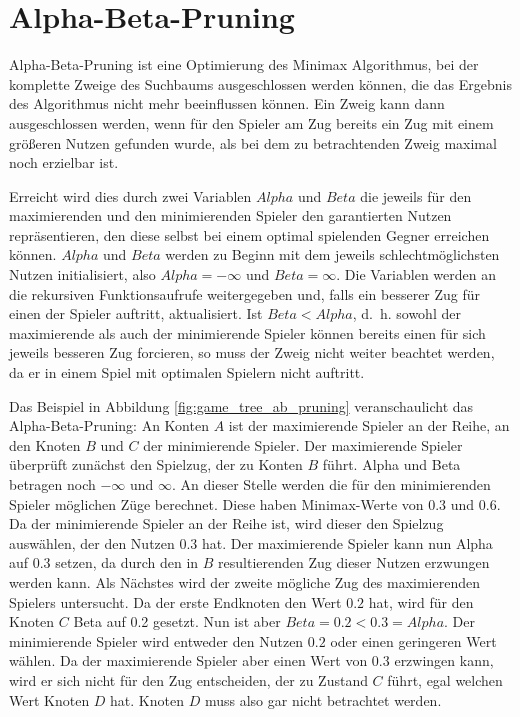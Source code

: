 \section{Alpha-Beta-Pruning}

Alpha-Beta-Pruning ist eine Optimierung des Minimax Algorithmus, bei der komplette Zweige des Suchbaums ausgeschlossen
werden können, die das Ergebnis des Algorithmus nicht mehr beeinflussen können. Ein Zweig kann dann ausgeschlossen
werden, wenn für den Spieler am Zug bereits ein Zug mit einem größeren Nutzen gefunden wurde, als bei dem zu
betrachtenden Zweig maximal noch erzielbar ist.

Erreicht wird dies durch zwei Variablen $Alpha$ und $Beta$ die jeweils für den maximierenden und den minimierenden
Spieler den garantierten Nutzen repräsentieren, den diese selbst bei einem optimal spielenden Gegner erreichen können.
$Alpha$ und $Beta$ werden zu Beginn mit dem jeweils schlechtmöglichsten Nutzen initialisiert, also $Alpha = -\infty$ und
$Beta = \infty$. Die Variablen werden an die rekursiven Funktionsaufrufe weitergegeben und, falls ein besserer Zug für
einen der Spieler auftritt, aktualisiert. Ist $Beta < Alpha$, d. h. sowohl der maximierende als auch der minimierende
Spieler können bereits einen für sich jeweils besseren Zug forcieren, so muss der Zweig nicht weiter beachtet werden, da
er in einem Spiel mit optimalen Spielern nicht auftritt.

Das Beispiel in Abbildung \ref{fig:game_tree_ab_pruning} veranschaulicht das Alpha-Beta-Pruning: An Konten $A$ ist der
maximierende Spieler an der Reihe, an den Knoten $B$ und $C$ der minimierende Spieler. Der maximierende Spieler
überprüft zunächst den Spielzug, der zu Konten $B$ führt. Alpha und Beta betragen noch $-\infty$ und $\infty$. An dieser
Stelle werden die für den minimierenden Spieler möglichen Züge berechnet. Diese haben Minimax-Werte von $0.3$ und $0.6$.
Da der minimierende Spieler an der Reihe ist, wird dieser den Spielzug auswählen, der den Nutzen $0.3$ hat. Der
maximierende Spieler kann nun Alpha auf 0.3 setzen, da durch den in $B$ resultierenden Zug dieser Nutzen erzwungen
werden kann. Als Nächstes wird der zweite mögliche Zug des maximierenden Spielers untersucht. Da der erste Endknoten den
Wert $0.2$ hat, wird für den Knoten $C$ Beta auf 0.2 gesetzt. Nun ist aber $Beta=0.2<0.3=Alpha$. Der minimierende
Spieler wird entweder den Nutzen $0.2$ oder einen geringeren Wert wählen. Da der maximierende Spieler aber einen Wert
von $0.3$ erzwingen kann, wird er sich nicht für den Zug entscheiden, der zu Zustand $C$ führt, egal welchen Wert Knoten
$D$ hat. Knoten $D$ muss also gar nicht betrachtet werden.

